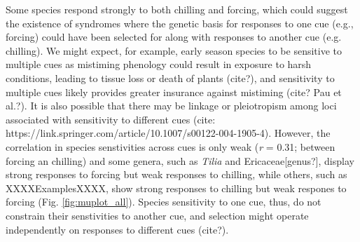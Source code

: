 \documentclass{article}\usepackage[]{graphicx}\usepackage[]{color}
\begin{document}

Some species respond strongly to both chilling and forcing, which could suggest the existence of syndromes where the genetic basis for responses to one cue (e.g., forcing) could have been selected for along with responses to another cue (e.g. chilling). We might expect, for example, early season species to be sensitive to multiple cues as mistiming phenology could result in exposure to harsh conditions, leading to tissue loss or death of plants (cite?), and sensitivity to multiple cues likely provides greater insurance against mistiming (cite? Pau et al.?). It is also possible that there may be linkage or pleiotropism among loci associated with sensitivity to different cues (cite: https://link.springer.com/article/10.1007/s00122-004-1905-4). However, the correlation in species senstivities across cues is only weak (\emph{r} = 0.31; between forcing an chilling) and some genera, such as \emph{Tilia} and Ericaceae[genus?], display strong responses to forcing but weak responses to chilling, while others, such as XXXXExamplesXXXX, show strong responses to chilling but weak respones to forcing (Fig. \ref{fig:muplot_all}). Species sensitivity to one cue, thus, do not constrain their senstivities to another cue, and selection might operate independently on responses to different cues (cite?).\\
\end{document}

